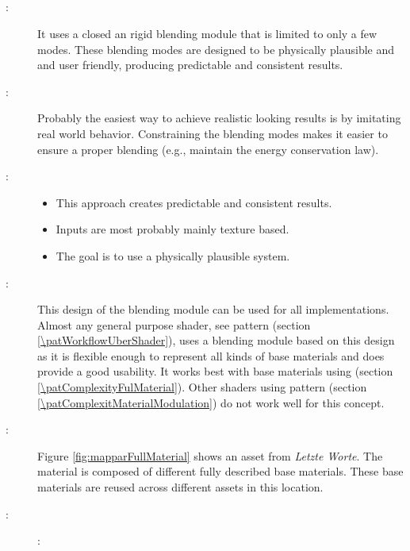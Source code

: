 \subsection{\patBlendingFull}\label{\patBlendingFull}
\begin{description}
	\item[\patIntent:]%
	It uses a closed an rigid blending module that is limited to only a few modes. These blending modes are designed to be physically plausible and and user friendly, producing predictable and consistent results.
	\item[\patMotivation:]%
	Probably the easiest way to achieve realistic looking results is by imitating real world behavior. Constraining the blending modes makes it easier to ensure a proper blending (e.g., maintain the energy conservation law). 
	\item[\patApplicability:]\hfill 
	\begin{itemize}\mynobreakpar
		\item This approach creates predictable and consistent results.
		\item Inputs are most probably mainly texture based. 
		\item The goal is to use a physically plausible system. 
	\end{itemize}
	\item[\patImplementation:]%
	This design of the blending module can be used for all implementations. Almost any general purpose shader, see pattern \emph{\patWorkflowUberShader} (section \ref{\patWorkflowUberShader}), uses a blending module based on this design as it is flexible enough to represent all kinds of base materials and does provide a good usability. It works best with base materials using \emph{\patComplexityFulMaterial} (section \ref{\patComplexityFulMaterial}). Other shaders using pattern \emph{\patComplexitMaterialModulation} (section \ref{\patComplexitMaterialModulation}) do not work well for this concept.
	\item[\patExamples:]%
	Figure \ref{fig:mapparFullMaterial} shows an asset from \emph{Letzte Worte}. The material is composed of different fully described base materials. These base materials are reused across different assets in this location.
	\item[\patConsequences:]\hfill 
		\begin{description}
			\item[\visual:]\hfill
			\begin{itemize}\mynobreakpar

\end{itemize}
\end{description}
\end{description}
